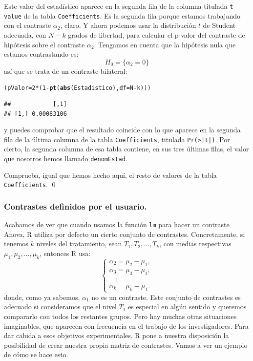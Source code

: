 \documentclass[10pt,a4paper]{article}\usepackage[]{graphicx}\usepackage[]{color}
\makeatletter
\newcommand{\hlnum}[1]{\textcolor[rgb]{0.686,0.059,0.569}{#1}}%
\newcommand{\hlopt}[1]{\textcolor[rgb]{0,0,0}{#1}}%
\newcommand{\hlstd}[1]{\textcolor[rgb]{0.345,0.345,0.345}{#1}}%
\newcommand{\hlkwb}[1]{\textcolor[rgb]{0.69,0.353,0.396}{#1}}%
\newcommand{\hlkwc}[1]{\textcolor[rgb]{0.333,0.667,0.333}{#1}}%
\newcommand{\hlkwd}[1]{\textcolor[rgb]{0.737,0.353,0.396}{\textbf{#1}}}%
\newenvironment{kframe}{%
 \def\at@end@of@kframe{}%
 \ifinner\ifhmode%
  \def\at@end@of@kframe{\end{minipage}}%
  \begin{minipage}{\columnwidth}%
 \fi\fi%
 \def\FrameCommand##1{\hskip\@totalleftmargin \hskip-\fboxsep
 \colorbox{shadecolor}{##1}\hskip-\fboxsep
     \hskip-\linewidth \hskip-\@totalleftmargin \hskip\columnwidth}%
 \MakeFramed {\advance\hsize-\width
   \@totalleftmargin\z@ \linewidth\hsize
   \@setminipage}}%
 {\par\unskip\endMakeFramed%
 \at@end@of@kframe}
\newenvironment{knitrout}{}{} %
\newcounter {cont01}
\makeatother
\begin{document}
Este valor del estadístico aparece en la segunda fila de la columna titulada {\tt t value} de la tabla {\tt Coefficients}. Es la segunda fila porque estamos trabajando con el contraste  $\alpha_2$, claro. Y ahora podemos usar la distribución $t$ de Student adecuada, con $N - k$ grados de libertad, para calcular el p-valor del contraste de hipótesis sobre el contraste $\alpha_2$. Tengamos en cuenta que la hipótesis nula que estamos contrastando es:
$$H_0 = \{\alpha_2 =0\}$$
así que se trata de un contraste bilateral:
\begin{knitrout}
\color{fgcolor}\begin{kframe}
\begin{alltt}
\hlstd{(pValor} \hlkwb{=} \hlnum{2} \hlopt{*} \hlstd{(}\hlnum{1} \hlopt{-} \hlkwd{pt}\hlstd{(}\hlkwd{abs}\hlstd{(Estadistico),} \hlkwc{df}\hlstd{=N}\hlopt{-}\hlstd{k)))}
\end{alltt}
\begin{verbatim}
##            [,1]
## [1,] 0.00083106
\end{verbatim}
\end{kframe}
\end{knitrout}
y puedes comprobar que el resultado coincide con lo que aparece en la segunda fila de la última columna de la tabla {\tt Coefficients}, titulada {\tt Pr(>|t|)}. Por cierto, la segunda columna de esa tabla contiene, en sus tres últimas filas, el valor que nosotros hemos llamado {\tt denomEstad}.

\begin{ejercicio}
\label{tut11:ejercicio07}
Comprueba, igual que hemos hecho aquí, el resto de valores de la tabla {\tt Coefficients}.
\qed
\end{ejercicio}


\subsubsection*{Contrastes definidos por el usuario.}
\label{tut11:subsubsec:ContrastesDefinidosPorElUsuario}

Acabamos de ver que cuando usamos la función {\tt lm} para hacer un contraste Anova,  R utiliza por defecto un cierto conjunto de contrastes. Concretamente, si tenemos $k$ niveles del tratamiento, sean $T_1, T_2, \ldots, T_k$, con medias respectivas $\mu_1, \mu_2,\ldots, \mu_k$, entonces R usa:
\[
\begin{cases}
\alpha_2=\mu_2-\mu_1,\\
\alpha_3=\mu_3-\mu_1,\\
\quad\vdots\\
\alpha_k=\mu_k-\mu_1.
\end{cases}
\]
donde, como ya sabemos,  $\alpha_1$ no es un contraste. Este conjunto de contrastes es adecuado si consideramos que el nivel $T_1$ es especial en algún sentido y  queremos compararlo con todos los restantes grupos. Pero hay muchas otras situaciones imaginables, que aparecen con frecuencia en el trabajo de los investigadores. Para dar cabida a esos objetivos experimentales, R pone a nuestra disposición la posibilidad de crear nuestra propia matriz de contrastes. Vamos a ver un ejemplo de cómo se hace esto.
\end{document}
